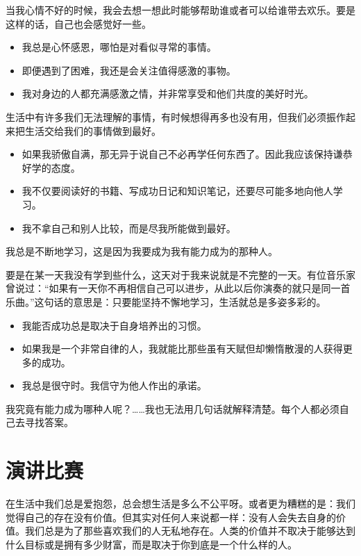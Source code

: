 \documentclass[fontset=founder]{ctexart}
\begin{document}
当我心情不好的时候，我会去想一想此时能够帮助谁或者可以给谁带去欢乐。要是这样的话，自己也会感觉好一些。

\begin{itemize}
    \item 我总是心怀感恩，哪怕是对看似寻常的事情。
    \item 即便遇到了困难，我还是会关注值得感激的事物。
    \item 我对身边的人都充满感激之情，并非常享受和他们共度的美好时光。
\end{itemize}

生活中有许多我们无法理解的事情，有时候想得再多也没有用，但我们必须振作起来把生活交给我们的事情做到最好。

\begin{itemize}
    \item 如果我骄傲自满，那无异于说自己不必再学任何东西了。因此我应该保持谦恭好学的态度。
    \item 我不仅要阅读好的书籍、写成功日记和知识笔记，还要尽可能多地向他人学习。
    \item 我不拿自己和别人比较，而是尽我所能做到最好。
\end{itemize}

我总是不断地学习，这是因为我要成为我有能力成为的那种人。

要是在某一天我没有学到些什么，这天对于我来说就是不完整的一天。有位音乐家曾说过：“如果有一天你不再相信自己可以进步，从此以后你演奏的就只是同一首乐曲。”这句话的意思是：只要能坚持不懈地学习，生活就总是多姿多彩的。

\begin{itemize}
    \item 我能否成功总是取决于自身培养出的习惯。
    \item 如果我是一个非常自律的人，我就能比那些虽有天赋但却懒惰散漫的人获得更多的成功。
    \item 我总是很守时。我信守为他人作出的承诺。
\end{itemize}

我究竟有能力成为哪种人呢？……我也无法用几句话就解释清楚。每个人都必须自己去寻找答案。

\section{演讲比赛}

在生活中我们总是爱抱怨，总会想生活是多么不公平呀。或者更为糟糕的是：我们觉得自己的存在没有价值。但其实对任何人来说都一样：没有人会失去自身的价值。我们总是为了那些喜欢我们的人无私地存在。人类的价值并不取决于能够达到什么目标或是拥有多少财富，而是取决于你到底是一个什么样的人。
\end{document}
